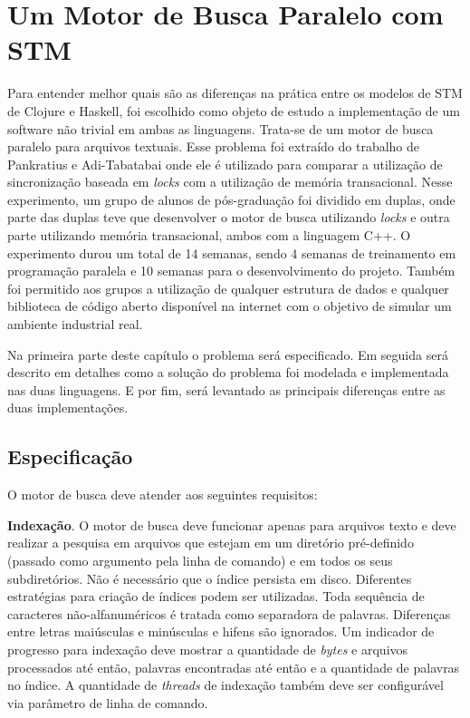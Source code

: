 \chapter{Um Motor de Busca Paralelo com STM}

\newcommand{\bigO}[1]{\ensuremath{\operatorname{O}\bigl(#1\bigr)}}

Para entender melhor quais são as diferenças na prática entre os modelos de STM de Clojure e Haskell, foi escolhido como objeto de estudo a implementação de um software não trivial em ambas as linguagens. Trata-se de um motor de busca paralelo para arquivos textuais. Esse problema foi extraído do trabalho de Pankratius e Adi-Tabatabai \cite{pankratius2011study} onde ele é utilizado para comparar a utilização de sincronização baseada em \emph{locks} com a utilização de memória transacional. Nesse experimento, um grupo de alunos de pós-graduação foi dividido em duplas, onde parte das duplas teve que desenvolver o motor de busca utilizando \emph{locks} e outra parte utilizando memória transacional, ambos com a linguagem C++. O experimento durou um total de 14 semanas, sendo 4 semanas de treinamento em programação paralela e 10 semanas para o desenvolvimento do projeto. Também foi permitido aos grupos a utilização de qualquer estrutura de dados e qualquer biblioteca de código aberto disponível na internet com o objetivo de simular um ambiente industrial real.

Na primeira parte deste capítulo o problema será especificado. Em seguida será descrito em detalhes como a solução do problema foi modelada e implementada nas duas linguagens. E por fim, será levantado as principais diferenças entre as duas implementações.

\section{Especificação}

O motor de busca deve atender aos seguintes requisitos: \cite{pankratius2011study}

\textbf{Indexação}. O motor de busca deve funcionar apenas para arquivos texto e deve realizar a pesquisa em arquivos que estejam em um diretório pré-definido (passado como argumento pela linha de comando) e em todos os seus subdiretórios. Não é necessário que o índice persista em disco. Diferentes estratégias para criação de índices podem ser utilizadas. Toda sequência de caracteres não-alfanuméricos é tratada como separadora de palavras. Diferenças entre letras maiúsculas e minúsculas e hifens são ignorados. Um indicador de progresso para indexação deve mostrar a quantidade de \emph{bytes} e arquivos processados até então, palavras encontradas até então e a quantidade de palavras no índice. A quantidade de \emph{threads} de indexação também deve ser configurável via parâmetro de linha de comando.

